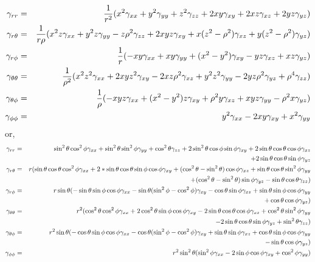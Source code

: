 \documentclass{article}
\begin{document}
\begin{eqnarray*}
  \gamma_{rr} &=&
  \frac{1}{r^2}
     (x^2\gamma_{xx}+
      y^2\gamma_{yy}+
      z^2\gamma_{zz}+
      2xy\gamma_{xy}+
      2xz\gamma_{xz}+
      2yz\gamma_{yz})
\\
  \gamma_{r\theta} &=&
  \frac{1}{r\rho}
     (x^2 z \gamma_{xx}
     +y^2 z \gamma_{yy}
     -z \rho^2 \gamma_{zz}
     +2xyz \gamma_{xy}
     +x(z^2-\rho^2)\gamma_{xz}
     +y(z^2-\rho^2)\gamma_{yz})
\\
  \gamma_{r\phi} &=&
  \frac{1}{r}
     (-xy\gamma_{xx}
      +xy\gamma_{yy}
      +(x^2-y^2)\gamma_{xy}
      -yz \gamma_{xz}
      +xz\gamma_{yz})
\\
  \gamma_{\theta\theta} &=&
  \frac{1}{\rho^2}
  (x^2z^2\gamma_{xx}
  +2xyz^2\gamma_{xy}
  -2xz\rho^2\gamma_{xz}
  +y^2z^2\gamma_{yy}
  -2yz\rho^2\gamma_{yz}
  +\rho^4\gamma_{zz})
\\
  \gamma_{\theta\phi} &=&
  \frac{1}{\rho}
  (-xyz\gamma_{xx}
   +(x^2-y^2)z\gamma_{xy}
   +\rho^2 y \gamma_{xz}
   +xyz\gamma_{yy}
   -\rho^2 x \gamma_{yz})
\\
  \gamma_{\phi\phi} &=&
   y^2\gamma_{xx}
   -2xy\gamma_{xy}
   +x^2\gamma_{yy}
\end{eqnarray*}   
or,
\begin{eqnarray*}
\gamma_{rr}&=&
\sin^2\theta\cos^2\phi\gamma_{xx}
+\sin^2\theta\sin^2\phi\gamma_{yy}
+\cos^2\theta\gamma_{zz}
+2\sin^2\theta\cos\phi\sin\phi\gamma_{xy}
+2\sin\theta\cos\theta\cos\phi\gamma_{xz}
\\
&&
+2\sin\theta\cos\theta\sin\phi\gamma_{yz}
\\
\gamma_{r\theta}&=&
r(\sin\theta\cos\theta\cos^2\phi\gamma_{xx}
+2*\sin\theta\cos\theta\sin\phi\cos\phi\gamma_{xy}
+(\cos^2\theta-\sin^2\theta)\cos\phi\gamma_{xz}
+\sin\theta\cos\theta\sin^2\phi\gamma_{yy}
\\
&&
+(\cos^2\theta-\sin^2\theta)\sin\phi\gamma_{yz}
-\sin\theta\cos\theta\gamma_{zz})
\\
\gamma_{r\phi}&=&
r\sin\theta(-\sin\theta\sin\phi\cos\phi\gamma_{xx}
-\sin\theta(\sin^2\phi-\cos^2\phi)\gamma_{xy}
-\cos\theta\sin\phi\gamma_{xz}
+\sin\theta\sin\phi\cos\phi\gamma_{yy}
\\
&&
+\cos\theta\cos\phi\gamma_{yz})
\\
\gamma_{\theta\theta}&=&
r^2(\cos^2\theta\cos^2\phi\gamma_{xx}
+2\cos^2\theta\sin\phi\cos\phi\gamma_{xy}
-2\sin\theta\cos\theta\cos\phi\gamma_{xz}
+\cos^2\theta\sin^2\phi\gamma_{yy}
\\
&&
-2\sin\theta\cos\theta\sin\phi\gamma_{yz}
+\sin^2\theta\gamma_{zz})
\\
\gamma_{\theta\phi}&=&
r^2\sin\theta(-\cos\theta\sin\phi\cos\phi\gamma_{xx}
-\cos\theta(\sin^2\phi-\cos^2\phi)\gamma_{xy}
+\sin\theta\sin\phi\gamma_{xz}
+\cos\theta\sin\phi\cos\phi\gamma_{yy}
\\
&&
-\sin\theta\cos\phi\gamma_{yz})
\\
\gamma_{\phi\phi}&=&
r^2\sin^2\theta(\sin^2\phi\gamma_{xx}
-2\sin\phi\cos\phi\gamma_{xy}
+\cos^2\phi\gamma_{yy})
\end{eqnarray*}
\end{document}
